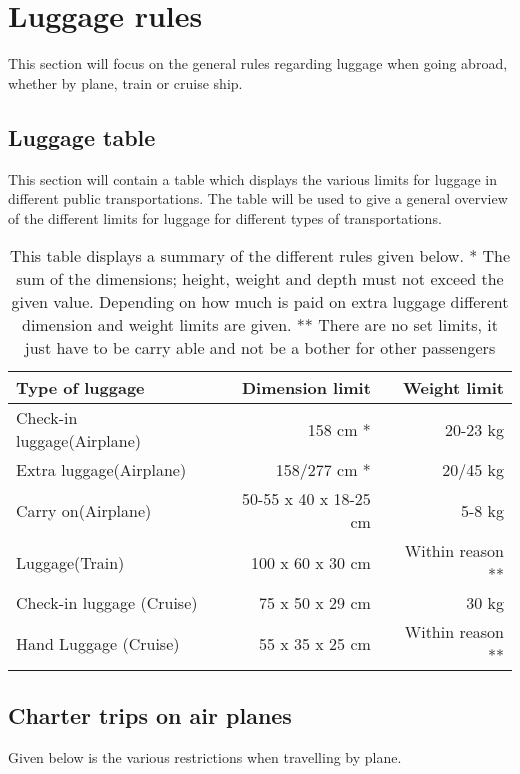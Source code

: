 \section{Luggage rules}
This section will focus on the general rules regarding luggage when going abroad, whether by plane, train or cruise ship.
\subsection{Luggage table}
This section will contain a table which displays the various limits for luggage in different public transportations. The table will be used to give a general overview of the different limits for luggage for different types of transportations.
\begin{table}[H]
\begin{tabular}{| l | r | r |}
\hline
Type of luggage &  Dimension limit & Weight limit \\ \hline
Check-in luggage(Airplane) & 158 cm * & 20-23 kg \\ \hline
Extra luggage(Airplane) & 158/277 cm * &  20/45 kg \\ \hline
Carry on(Airplane) & 50-55 x 40 x 18-25 cm & 5-8 kg \\ \hline
Luggage(Train) & 100 x 60 x 30 cm & Within reason **\\ \hline
Check-in luggage (Cruise) & 75 x 50 x 29 cm & 30 kg \\ \hline
Hand Luggage (Cruise) & 55 x 35 x 25 cm & Within reason **\\ \hline
\end{tabular}
\caption{This table displays a summary of the different rules given below.\newline
* The sum of the dimensions; height, weight and depth must not exceed the given value. 
Depending on how much is paid on extra luggage different dimension and weight limits are given.\newline
** There are no set limits, it just have to be carry able and not be a bother for other passengers}
\end{table}

\subsection{Charter trips on air planes}
Given below is the various restrictions when travelling by plane.

